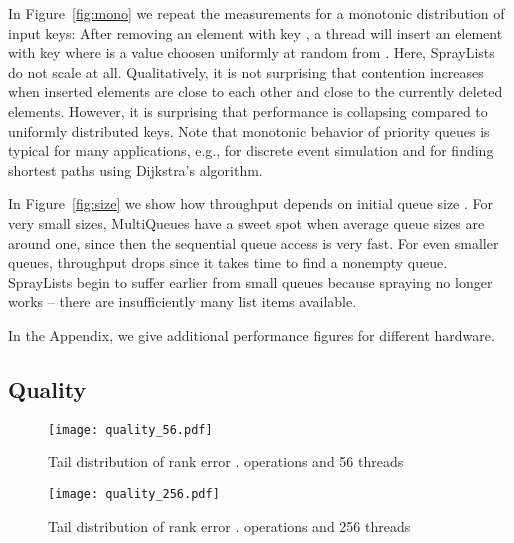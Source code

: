 \documentclass[a4paper,12pt]{article}
\newcommand{\Id}[1]{\ensuremath{\text{{\sf #1}}}}
\newcommand{\frage}[1]{{[\bf #1]}\marginpar{}}
\renewcommand{\frage}[1]{}
\begin{document}
\frage{todo: put tic marks on all axes of figures.}
In Figure~\ref{fig:mono} we repeat the measurements for a monotonic distribution of input keys:
After removing an element with key , a thread will insert an element with key  where  is a value choosen uniformly at random from . Here, SprayLists do not scale at all. Qualitatively, 
it is not surprising that contention increases when inserted elements are close to each other and close to the currently deleted elements. However, it is surprising that performance is collapsing compared to uniformly distributed keys. Note that monotonic behavior of priority queues is typical for many applications, e.g., for discrete event simulation and for finding shortest paths using Dijkstra's algorithm.

In Figure~\ref{fig:size} we show how throughput depends on initial queue size . 
For very small sizes, MultiQueues have a sweet spot when average queue sizes are around one, since then the sequential queue access is very fast. For even smaller queues, throughput drops since it takes time to find a nonempty queue. 
SprayLists begin to suffer earlier from small queues  because spraying no longer works -- there are insufficiently many list items available. 

In the Appendix, we give additional performance figures for different hardware.
\subsection{Quality}
\begin{figure}[h]
\centering\texttt{[image: quality\_56.pdf]}
\caption{Tail distribution of rank error .  operations and 56 threads}
\label{fig:quality}
\end{figure}
\begin{figure}[h]
\centering\texttt{[image: quality\_256.pdf]}
\caption{Tail distribution of rank error .  operations and 256 threads}
\label{fig:quality256}
\end{figure}


\frage{todo: half the x-range of Figure~\ref{fig:quality}. optional: average rank over time. doubleoptional: vary number of sampled queues for \Id{deleteMin}, values 1,2,3,4}
\end{document}
